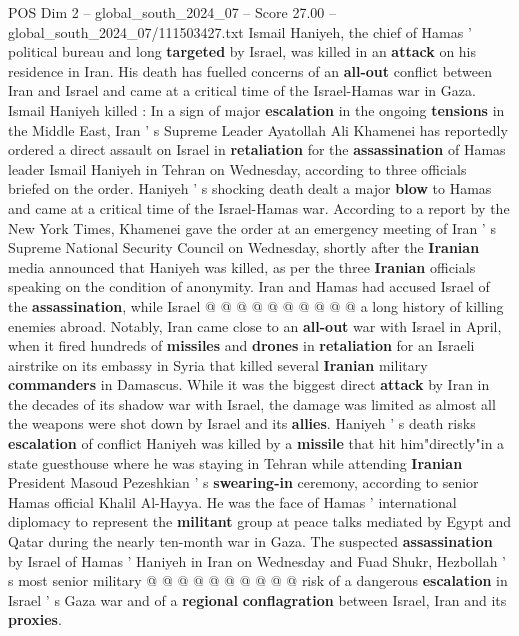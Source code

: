 \begin{textsample}{POS Dim 2 – global\_south\_2024\_07 – Score 27.00 – global\_south\_2024\_07/111503427.txt}  \label{ex:f2_pos_062}
Ismail Haniyeh, the chief of Hamas ' political bureau and long \textbf{targeted} by Israel, was killed in an \textbf{attack} on his residence in Iran.
His death has fuelled concerns of an \textbf{all-out} conflict between Iran and Israel and came at a critical time of the Israel-Hamas war in Gaza.
Ismail Haniyeh killed : In a sign of major \textbf{escalation} in the ongoing \textbf{tensions} in the Middle East, Iran ' s Supreme Leader Ayatollah Ali Khamenei has reportedly ordered a direct assault on Israel in \textbf{retaliation} for the \textbf{assassination} of Hamas leader Ismail Haniyeh in Tehran on Wednesday, according to three officials briefed on the order.
Haniyeh ' s shocking death dealt a major \textbf{blow} to Hamas and came at a critical time of the Israel-Hamas war.
According to a report by the New York Times, Khamenei gave the order at an emergency meeting of Iran ' s Supreme National Security Council on Wednesday, shortly after the \textbf{Iranian} media announced that Haniyeh was killed, as per the three \textbf{Iranian} officials speaking on the condition of anonymity.
Iran and Hamas had accused Israel of the \textbf{assassination}, while Israel @ @ @ @ @ @ @ @ @ @ a long history of killing enemies abroad.
Notably, Iran came close to an \textbf{all-out} war with Israel in April, when it fired hundreds of \textbf{missiles} and \textbf{drones} in \textbf{retaliation} for an Israeli airstrike on its embassy in Syria that killed several \textbf{Iranian} military \textbf{commanders} in Damascus.
While it was the biggest direct \textbf{attack} by Iran in the decades of its shadow war with Israel, the damage was limited as almost all the weapons were shot down by Israel and its \textbf{allies}.
Haniyeh ' s death risks \textbf{escalation} of conflict Haniyeh was killed by a \textbf{missile} that hit him"directly"in a state guesthouse where he was staying in Tehran while attending \textbf{Iranian} President Masoud Pezeshkian ' s \textbf{swearing-in} ceremony, according to senior Hamas official Khalil Al-Hayya.
He was the face of Hamas ' international diplomacy to represent the \textbf{militant} group at peace talks mediated by Egypt and Qatar during the nearly ten-month war in Gaza.
The suspected \textbf{assassination} by Israel of Hamas ' Haniyeh in Iran on Wednesday and Fuad Shukr, Hezbollah ' s most senior military @ @ @ @ @ @ @ @ @ @ risk of a dangerous \textbf{escalation} in Israel ' s Gaza war and of a \textbf{regional} \textbf{conflagration} between Israel, Iran and its \textbf{proxies}.

\end{textsample}
